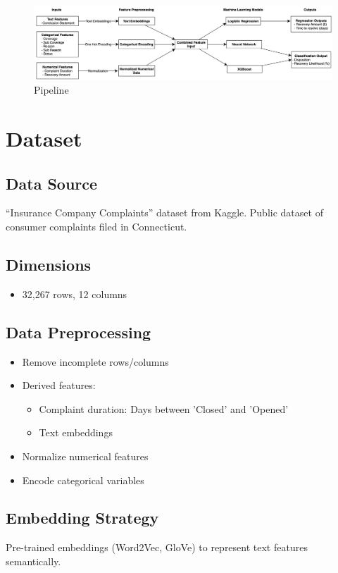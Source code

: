 \documentclass[final]{article}
\begin{document}
\begin{figure}[h]
  \centering
  \includegraphics[width=1.0\textwidth]{ml-flowchart.png}
  \caption{Pipeline}
  \label{fig: Pipeline}
\end{figure}

\section{Dataset}

\subsection{Data Source}
“Insurance Company Complaints” dataset from Kaggle. Public dataset of consumer complaints filed in Connecticut.

\subsection{Dimensions}
\begin{itemize}
  \item 32,267 rows, 12 columns
\end{itemize}

\subsection{Data Preprocessing}
\begin{itemize}
  \item Remove incomplete rows/columns
  \item Derived features:
  \begin{itemize}
    \item Complaint duration: Days between 'Closed' and 'Opened'
    \item Text embeddings
  \end{itemize}
  \item Normalize numerical features
  \item Encode categorical variables
\end{itemize}

\subsection{Embedding Strategy}
Pre-trained embeddings (Word2Vec, GloVe) to represent text features semantically.
\end{document}
